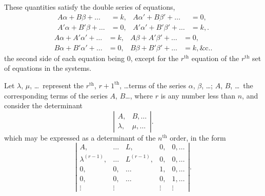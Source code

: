 \documentclass[11pt,a4paper]{article}
\theoremstyle{plain}
\theoremstyle{definition}
\theoremstyle{remark}
\begin{document}
These quantities satisfy the double series of equations,
\begin{align*}
A\alpha + B\beta + \ldots &= k, &
A\alpha' + B\beta' + \ldots &= 0, \\
A'\alpha + B'\beta + \ldots &= 0, &
A'\alpha' + B'\beta' + \ldots &= k,
\tag{5}.
\end{align*}
\begin{align*}
A\alpha + A'\alpha' + \ldots &= k, &
A\beta + A'\beta' + \ldots &= 0, \\
B\alpha + B'\alpha' + \ldots &= 0, &
B\beta + B'\beta' + \ldots &= k,
\&\text{c.}
\tag{6}.
\end{align*}
the second side of each equation being $0$, except for the $r^{\text{th}}$ equation of the $r^{\text{th}}$ set
of equations in the systems.

Let $\lambda$, $\mu$, \ldots\ represent the $r^{\text{th}}$, $r+1^{\text{th}}$, \ldots terms of the series $\alpha$, $\beta$, \ldots;
$A$, $B$, \ldots\ the corresponding terms of the series $A$, $B$\ldots, where $r$ is any number less
than $n$, and consider the determinant
\[
\left|\begin{array}{cc}
A, & B, \ldots \\
\lambda, & \mu, \ldots
\end{array}\right|
\tag{8}.
\]
which may be expressed as a determinant of the $n^{\text{th}}$ order, in the form
\[
\left|\begin{array}{cccccc}
A, & \ldots & L, & 0, & 0, \ldots \\
\lambda^{(r-1)}, & \ldots & L^{(r-1)}, & 0, & 0, \ldots \\
0, & 0, & \ldots & 1, & 0, \ldots \\
0, & 0, & \ldots & 0, & 1, \ldots \\
\vdots & \vdots & & \vdots & \vdots
\end{array}\right|
\tag{9}.
\]
\end{document}
